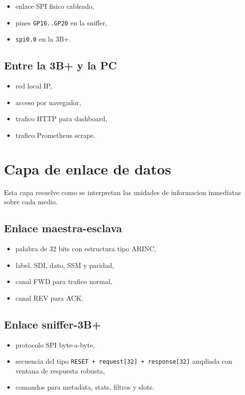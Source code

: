 \documentclass[12pt,a4paper]{report}
\begin{document}
\begin{itemize}
    \item enlace SPI fisico cableado,
    \item pines \texttt{GP16..GP20} en la sniffer,
    \item \texttt{spi0.0} en la 3B+.
\end{itemize}

\subsection*{Entre la 3B+ y la PC}

\begin{itemize}
    \item red local IP,
    \item acceso por navegador,
    \item trafico HTTP para dashboard,
    \item trafico Prometheus scrape.
\end{itemize}

\section{Capa de enlace de datos}

Esta capa resuelve como se interpretan las unidades de informacion inmediatas sobre cada medio.

\subsection*{Enlace maestra-esclava}

\begin{itemize}
    \item palabra de 32 bits con estructura tipo ARINC,
    \item label, SDI, dato, SSM y paridad,
    \item canal FWD para trafico normal,
    \item canal REV para ACK.
\end{itemize}

\subsection*{Enlace sniffer-3B+}

\begin{itemize}
    \item protocolo SPI byte-a-byte,
    \item secuencia del tipo \texttt{RESET + request[32] + response[32]} ampliada con ventana de respuesta robusta,
    \item comandos para metadata, stats, filtros y slots.
\end{itemize}
\end{document}
